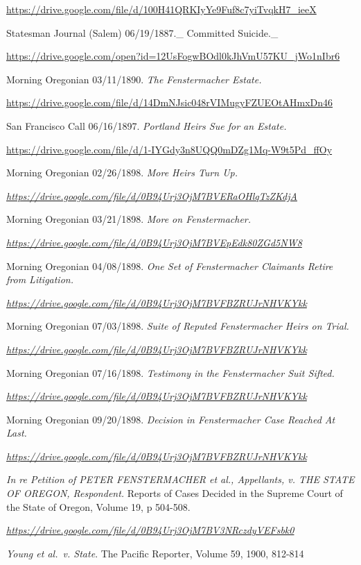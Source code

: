 \documentclass[
  12pt,
]{book}
\begin{document}
\href{https://drive.google.com/file/d/100H41QRKIyYe9Fuf8c7yiTvqkH7_ieeX/view}{https://drive.google.com/file/d/100H41QRKIyYe9Fuf8c7yiTvqkH7\_ieeX}

Statesman Journal (Salem) 06/19/1887.\_ Committed Suicide.\_

\url{https://drive.google.com/open?id=12UsFogwBOdl0kJhVmU57KU_jWo1nIbr6}

Morning Oregonian 03/11/1890. \emph{The Fenstermacher Estate.}

\url{https://drive.google.com/file/d/14DmNJsic048rVIMugyFZUEOtAHmxDn46}

San Francisco Call 06/16/1897. \emph{Portland Heirs Sue for an Estate.}

\url{https://drive.google.com/file/d/1-IYGdy3n8UQQ0mDZg1Mq-W9t5Pd_ffOy}

Morning Oregonian 02/26/1898. \emph{More Heirs Turn Up.}

\emph{\url{https://drive.google.com/file/d/0B94Urj3OjM7BVERaOHlqTzZKdjA}}

Morning Oregonian 03/21/1898. \emph{More on Fenstermacher.}

\emph{\url{https://drive.google.com/file/d/0B94Urj3OjM7BVEpEdk80ZGd5NW8}}

Morning Oregonian 04/08/1898. \emph{One Set of Fenstermacher Claimants Retire from Litigation.}

\emph{\url{https://drive.google.com/file/d/0B94Urj3OjM7BVFBZRUJrNHVKYkk}}

Morning Oregonian 07/03/1898. \emph{Suite of Reputed Fenstermacher Heirs on Trial.}

\emph{\url{https://drive.google.com/file/d/0B94Urj3OjM7BVFBZRUJrNHVKYkk}}

Morning Oregonian 07/16/1898. \emph{Testimony in the Fenstermacher Suit Sifted.}

\emph{\url{https://drive.google.com/file/d/0B94Urj3OjM7BVFBZRUJrNHVKYkk}}

Morning Oregonian 09/20/1898. \emph{Decision in Fenstermacher Case Reached At Last.}

\emph{\url{https://drive.google.com/file/d/0B94Urj3OjM7BVFBZRUJrNHVKYkk}}

\emph{In re Petition of PETER FENSTERMACHER et al., Appellants, v. THE STATE OF OREGON, Respondent.} Reports of Cases Decided in the Supreme Court of the State of Oregon, Volume 19, p 504-508.

\emph{\url{https://drive.google.com/file/d/0B94Urj3OjM7BV3NRczdyVEFsbk0}}

\emph{Young et al.~v. State}. The Pacific Reporter, Volume 59, 1900, 812-814
\end{document}
